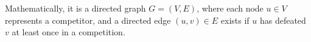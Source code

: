 \documentclass[preview]{standalone}
\begin{document}
Mathematically, it is a directed graph $G = (V, E)$, where each node $u \in V$ represents a competitor, and a directed edge $(u, v) \in E$ exists if $u$ has defeated $v$ at least once in a competition.\\
\end{document}
